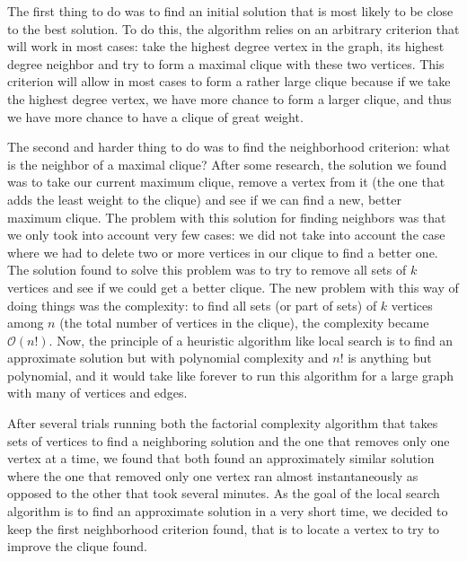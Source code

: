The first thing to do was to find an initial solution that is most likely to be 
close to the best solution. To do this, the algorithm relies on an arbitrary 
criterion that will work in most cases: take the highest degree vertex in the 
graph, its highest degree neighbor and try to form a maximal clique with these 
two vertices. This criterion will allow in most cases to form a rather large 
clique because if we take the highest degree vertex, we have more chance to form 
a larger clique, and thus we have more chance to have a clique of great weight.
\bigskip

The second and harder thing to do was to find the neighborhood criterion: what 
is the neighbor of a maximal clique? After some research, the solution we found 
was to take our current maximum clique, remove a vertex from it (the one that adds 
the least weight to the clique) and see if we can find a new, better maximum 
clique. The problem with this solution for finding neighbors was that we only 
took into account very few cases: we did not take into account the case where we 
had to delete two or more vertices in our clique to find a better one. The 
solution found to solve this problem was to try to remove all sets of $k$ vertices 
and see if we could get a better clique. The new problem with this way of doing 
things was the complexity: to find all sets (or part of sets) of $k$ vertices among 
$n$ (the total number of vertices in the clique), the complexity became $\mathcal{O}(n!)$. 
Now, the principle of a heuristic algorithm like local search is to find an approximate 
solution but with polynomial complexity and $n!$ is anything but polynomial, and it 
would take like forever to run this algorithm for a large graph with many of vertices 
and edges.
\bigskip

After several trials running both the factorial complexity algorithm that takes 
sets of vertices to find a neighboring solution and the one that removes only one 
vertex at a time, we found that both found an approximately similar solution where 
the one that removed only one vertex ran almost instantaneously as opposed to the 
other that took several minutes. As the goal of the local search algorithm is to 
find an approximate solution in a very short time, we decided to keep the first 
neighborhood criterion found, that is to locate a vertex to try to improve the 
clique found.